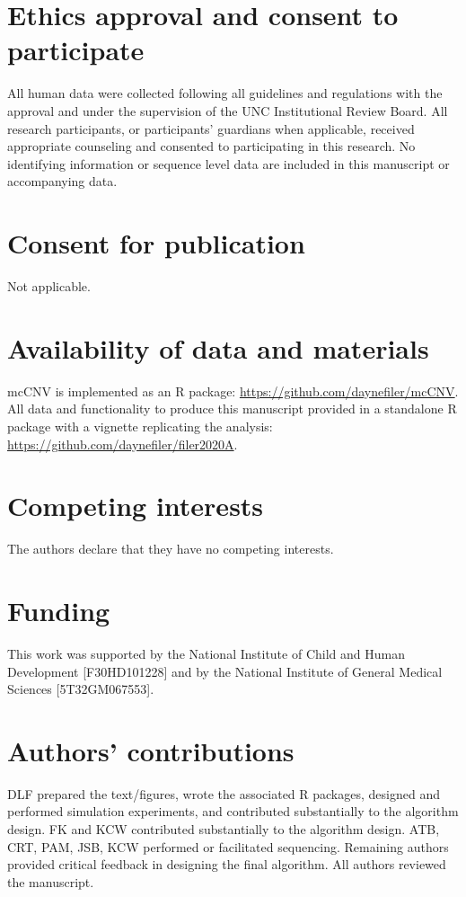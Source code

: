 \documentclass{bmcart}\usepackage[]{graphicx}\usepackage[]{color}
\begin{document}
\begin{backmatter}

\section*{Ethics approval and consent to participate}%
All human data were collected following all guidelines and regulations with the approval and under the supervision of the UNC Institutional Review Board.
All research participants, or participants' guardians when applicable, received appropriate counseling and consented to participating in this research.
No identifying information or sequence level data are included in this manuscript or accompanying data.

\section*{Consent for publication}
Not applicable.

\section*{Availability of data and materials}%
mcCNV is implemented as an R package: \url{https://github.com/daynefiler/mcCNV}. All data and functionality to produce this manuscript provided in a standalone R package with a vignette replicating the analysis: \url{https://github.com/daynefiler/filer2020A}.

\section*{Competing interests}
The authors declare that they have no competing interests.

\section*{Funding}%
This work was supported by the National Institute of Child and Human Development [F30HD101228] and by the National Institute of General Medical Sciences [5T32GM067553].

\section*{Authors' contributions}
DLF prepared the text/figures, wrote the associated R packages, designed and performed simulation experiments, and contributed substantially to the algorithm design. FK and KCW contributed substantially to the algorithm design. ATB, CRT, PAM, JSB, KCW performed or facilitated sequencing. Remaining authors provided critical feedback in designing the final algorithm. All authors reviewed the manuscript.


\end{backmatter}
\end{document}
